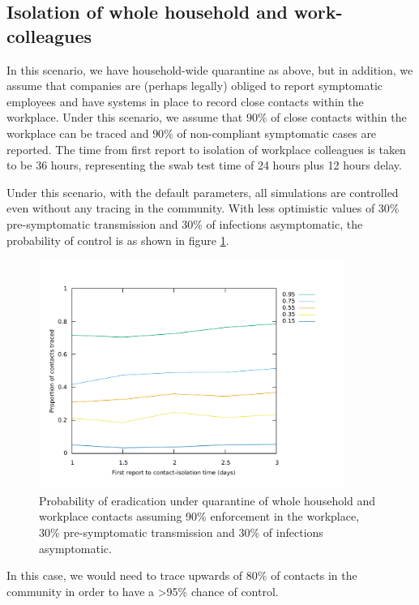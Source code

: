 \documentclass{article}
\begin{document}
\subsection{Isolation of whole household and work-colleagues}

In this scenario, we have household-wide quarantine as above, but in addition, we assume that companies are (perhaps legally) obliged to report symptomatic employees and have systems in place to record close contacts within the workplace. Under this scenario, we assume that $90\%$ of close contacts within the workplace can be traced and $90\%$ of non-compliant symptomatic cases are reported. The time from first report to isolation of workplace colleagues is taken to be 36 hours, representing the swab test time of 24 hours plus 12 hours delay.

Under this scenario, with the default parameters, all simulations are controlled even without any tracing in the community. With less optimistic values of 30\% pre-symptomatic transmission and 30\% of infections asymptomatic, the probability of control is as shown in figure \ref{householdWorkplace3030}.

\begin{figure}
\begin{center}
\includegraphics[width = 10cm]{contourWorkplace.pdf}
\end{center}
\caption{Probability of eradication under quarantine of whole household and workplace contacts assuming 90\% enforcement in the workplace, 30\% pre-symptomatic transmission and 30\% of infections asymptomatic.}
\label{householdWorkplace3030}
\end{figure}

In this case, we would need to trace upwards of 80\% of contacts in the community in order to have a >95\% chance of control.
\end{document}
